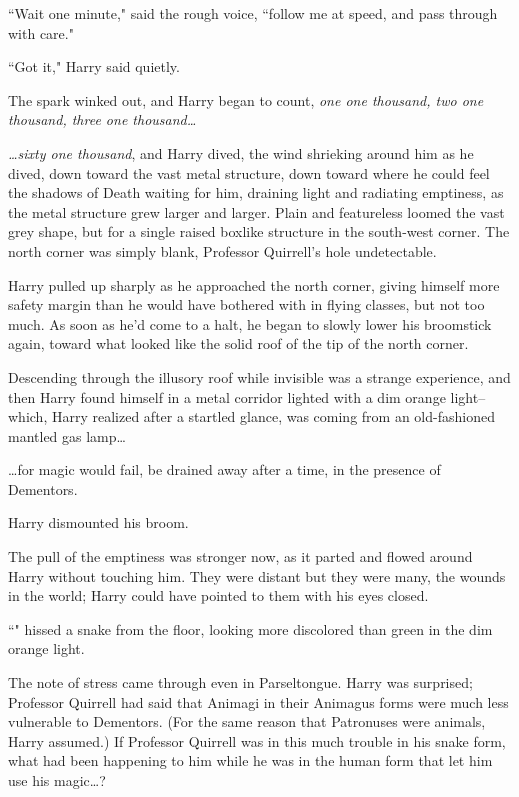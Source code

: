``Wait one minute," said the rough voice, ``follow me at speed, and pass through with care."

``Got it," Harry said quietly.

The spark winked out, and Harry began to count, \emph{one one thousand, two one thousand, three one thousand{\ldots}}

\emph{{\ldots}sixty one thousand}, and Harry dived, the wind shrieking around him as he dived, down toward the vast metal structure, down toward where he could feel the shadows of Death waiting for him, draining light and radiating emptiness, as the metal structure grew larger and larger. Plain and featureless loomed the vast grey shape, but for a single raised boxlike structure in the south-west corner. The north corner was simply blank, Professor Quirrell's hole undetectable.

Harry pulled up sharply as he approached the north corner, giving himself more safety margin than he would have bothered with in flying classes, but not too much. As soon as he'd come to a halt, he began to slowly lower his broomstick again, toward what looked like the solid roof of the tip of the north corner.

Descending through the illusory roof while invisible was a strange experience, and then Harry found himself in a metal corridor lighted with a dim orange light\---which, Harry realized after a startled glance, was coming from an old-fashioned mantled gas lamp{\ldots}

{\ldots}for magic would fail, be drained away after a time, in the presence of Dementors.

Harry dismounted his broom.

The pull of the emptiness was stronger now, as it parted and flowed around Harry without touching him. They were distant but they were many, the wounds in the world; Harry could have pointed to them with his eyes closed.

``" hissed a snake from the floor, looking more discolored than green in the dim orange light.

The note of stress came through even in Parseltongue. Harry was surprised; Professor Quirrell had said that Animagi in their Animagus forms were much less vulnerable to Dementors. (For the same reason that Patronuses were animals, Harry assumed.) If Professor Quirrell was in this much trouble in his snake form, what had been happening to him while he was in the human form that let him use his magic{\ldots}?

